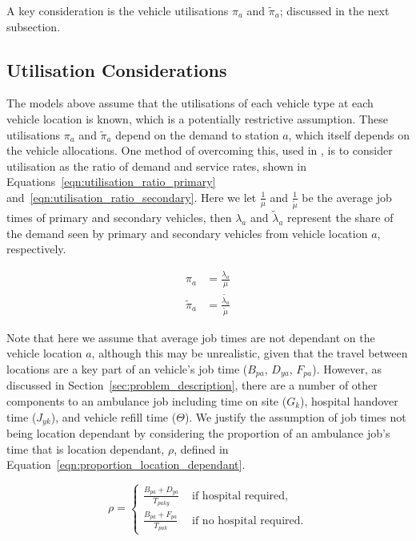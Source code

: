 \documentclass[preprint,12pt]{elsarticle}
\begin{document}
A key consideration is the vehicle utilisations $\pi_a$ and $\tilde{\pi}_a$;
discussed in the next subsection.

\subsection{Utilisation Considerations}\label{sec:utilisation}
The models above assume that the utilisations of each vehicle type at each
vehicle location is known, which is a potentially restrictive assumption.
These utilisations $\pi_a$ and $\tilde{\pi}_a$ depend on the demand to station
$a$, which itself depends on the vehicle allocations. One method of overcoming
this, used in \cite{Knight2012918}, is to consider utilisation as the ratio of
demand and service rates, shown in Equations~\ref{eqn:utilisation_ratio_primary}
and~\ref{eqn:utilisation_ratio_secondary}. Here we let $\frac{1}{\mu}$ and
$\frac{1}{\tilde{\mu}}$ be the average job times of primary and secondary
vehicles, then $\lambda_a$ and $\tilde{\lambda}_a$ represent the share of the
demand seen by primary and secondary vehicles from vehicle location $a$,
respectively.

\begin{align}
\pi_a &= \frac{\lambda_a}{\mu} \label{eqn:utilisation_ratio_primary}\\
\tilde{\pi}_a &= \frac{\tilde{\lambda_a}}{\tilde{\mu}} \label{eqn:utilisation_ratio_secondary}
\end{align}

Note that here we assume that average job times are not dependant on the vehicle
location $a$, although this may be unrealistic, given that the travel between
locations are a key part of an vehicle's job time ($B_{pa}$, $D_{ya}$, $F_{pa}$).
However, as discussed in Section~\ref{sec:problem_description}, there are a
number of other components to an ambulance job including time on site ($G_k$),
hospital handover time ($J_{yk}$), and vehicle refill time ($\Theta$). We
justify the assumption of job times not being location dependant by considering
the proportion of an ambulance job's time that is location dependant, $\rho$,
defined in Equation~\ref{eqn:proportion_location_dependant}.

\begin{equation}\label{eqn:proportion_location_dependant}
\rho = \begin{cases}
  \frac{B_{pa} + D_{ya}}{T_{paky}} & \text{ if hospital required,} \\[8pt]
  \frac{B_{pa} + F_{pa}}{T_{pak}} & \text{ if no hospital required.}
\end{cases}
\end{equation}
\end{document}
